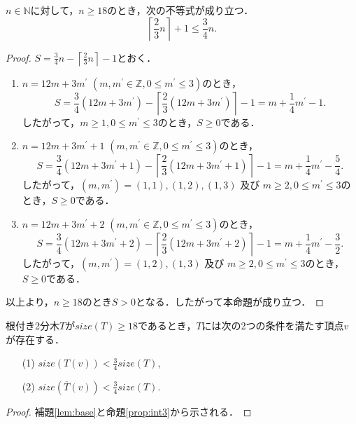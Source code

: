 \begin{proposition}\label{prop:int3}
$n\in\mathbb{N}$に対して，$n\geq 18$のとき，次の不等式が成り立つ．
$$
\left\lceil\frac{2}{3}n\right\rceil + 1 \leq \frac{3}{4}n.
$$
\end{proposition}
\begin{proof}
$\displaystyle S = \frac{3}{4}n - \left\lceil\frac{2}{3}n\right\rceil - 1$とおく．
\begin{enumerate}
\item $n = 12 m + 3 m^{\prime}$ $(m, m^{\prime} \in \mathbb{Z}, 0\leq m^{\prime} \leq 3)$のとき，
$$S = \frac{3}{4}(12 m + 3 m^{\prime}) - \left\lceil\frac{2}{3}(12 m + 3 m^{\prime})\right\rceil - 1
 = m + \frac{1}{4}m^{\prime} - 1.$$
したがって，$m\geq 1, 0\leq m^{\prime} \leq 3$のとき，$S \geq 0$である．
\item $n = 12 m + 3 m^{\prime} + 1$ $(m, m^{\prime} \in \mathbb{Z}, 0\leq m^{\prime} \leq 3)$のとき，
$$S = \frac{3}{4}(12 m + 3 m^{\prime} + 1) - \left\lceil\frac{2}{3}(12 m + 3 m^{\prime} + 1)\right\rceil - 1
 = m + \frac{1}{4}m^{\prime} - \frac{5}{4}.$$
したがって，$(m,m^{\prime}) = (1, 1), (1, 2), (1, 3)$ 及び $m \geq 2, 0\leq m^{\prime} \leq 3$のとき，$S \geq 0$である．
\item $n = 12 m + 3 m^{\prime} + 2$ $(m, m^{\prime} \in \mathbb{Z}, 0\leq m^{\prime} \leq 3)$のとき，
$$S = \frac{3}{4}(12 m + 3 m^{\prime} + 2) - \left\lceil\frac{2}{3}(12 m + 3 m^{\prime} + 2)\right\rceil - 1
 = m + \frac{1}{4}m^{\prime} - \frac{3}{2}.$$
したがって，$(m,m^{\prime}) = (1, 2), (1, 3)$ 及び $m \geq 2, 0\leq m^{\prime} \leq 3$のとき，$S \geq 0$である．
\end{enumerate}
以上より，$n\geq 18$のとき$S > 0$となる．したがって本命題が成り立つ．
\end{proof}

\begin{corollary}\label{cor:1}
  根付き2分木$T$が$size(T)\geq 18$であるとき，$T$には次の2つの条件を満たす頂点$v$が存在する．
  \begin{enumerate}
  \item[(1)] $\displaystyle size(T(v)) < \frac{3}{4}size(T)$,\smallskip
  \item[(2)] $\displaystyle size(\overline{T}(v)) < \frac{3}{4}size(T)$.
  \end{enumerate}
\end{corollary}

\begin{proof}
補題\ref{lem:base}と命題\ref{prop:int3}から示される．
\end{proof}

